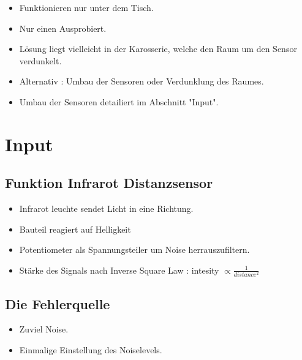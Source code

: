 \documentclass{article}
\begin{document}
\begin{itemize}

\item Funktionieren nur unter dem Tisch.

\item Nur einen Ausprobiert.

\item L\"{o}sung liegt vielleicht in der Karosserie, welche den Raum um den Sensor verdunkelt.

\item Alternativ : Umbau der Sensoren oder Verdunklung des Raumes.

\item Umbau der Sensoren detailiert im Abschnitt "Input". 

\end{itemize}

\section{Input}

\subsection{Funktion Infrarot Distanzsensor}

\begin{itemize}


\item Infrarot leuchte sendet Licht in eine Richtung.

\item Bauteil reagiert auf Helligkeit

\item Potentiometer als Spannungsteiler um Noise herrauszufiltern. 

\item St\"{a}rke des Signals nach Inverse Square Law : intesity $\propto \frac{1}{distance^2}$ 

\end{itemize}

\subsection{Die Fehlerquelle}

\begin{itemize}

\item Zuviel Noise.

\item Einmalige Einstellung des Noiselevels.

\end{itemize}
\end{document}
